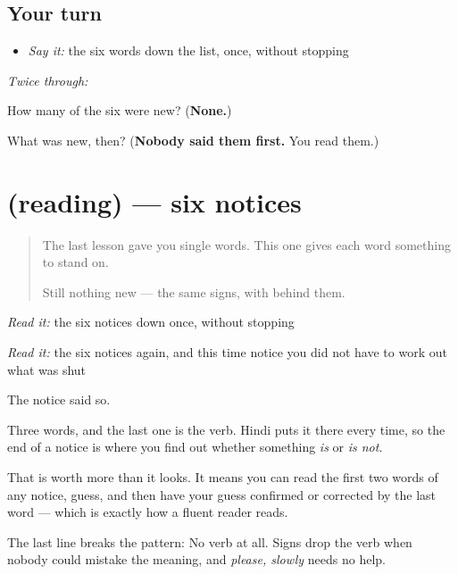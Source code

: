 \subsection*{Your turn}
\begin{itemize}
\raggedright
  \item \emph{Say it:} the six words down the list, once, without stopping
\end{itemize}

\emph{Twice through:}

\begin{tcolorbox}[breakable,colback=teal!4,colframe=teal!35!black,title={Before you move on}]
How many of the six were new? (\textbf{None.})

What was new, then? (\textbf{Nobody said them first.} You read them.)
\end{tcolorbox}
\section[(reading)]{(reading) — six notices}

\label{lesson:HI-C78-notices}



\begin{quote}
The last lesson gave you single words. This one gives each word something to stand on.

Still nothing new — the same signs, with \textbf{} behind them.
\end{quote}

\begin{tcolorbox}[breakable,skin=enhanced,colback=orange!6,colframe=orange!45!black,boxrule=0.5pt,arc=1mm,left=6pt,right=6pt,top=4pt,bottom=4pt,fonttitle=\bfseries,title={Read this}]
\begin{quote}
                
\end{quote}

\emph{Read it:} the six notices down once, without stopping

\emph{Read it:} the six notices again, and this time notice you did not have to work out what was shut

The notice said so.
\end{tcolorbox}

\begin{culture}
\textbf{  } Three words, and the last one is the verb. Hindi puts it there every time, so the end of a notice is where you find out whether something \emph{is} or \emph{is not}.

That is worth more than it looks. It means you can read the first two words of any notice, guess, and then have your guess confirmed or corrected by the last word — which is exactly how a fluent reader reads.

The last line breaks the pattern: \textbf{ } No verb at all. Signs drop the verb when nobody could mistake the meaning, and \emph{please, slowly} needs no help.
\end{culture}

